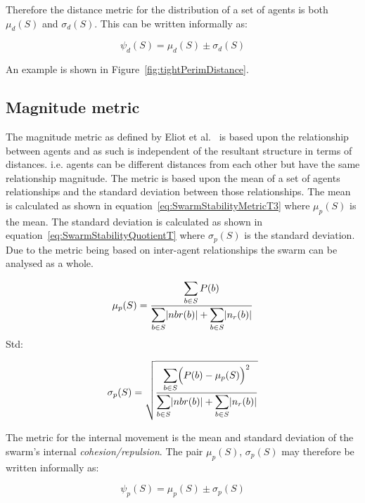 \documentclass[12pt,a4paper]{IEEEtran}
\newcommand{\card}[1]{\vert{#1}\vert}
\begin{document}
Therefore the distance metric for the distribution of a set of agents is both $\mu_d(S)$ and $\sigma_d(S)$. This can be written informally as:

\small
\begin{equation}
\label{eq:SwarmPotentialMagnitude}
\psi_d(S) = \mu_d(S)\pm \sigma_d(S)
\end{equation}
\normalsize

An example is shown in Figure~\ref{fig:tightPerimDistance}.

\subsection{Magnitude metric}
The magnitude metric as defined by Eliot et al.~\cite{eliot2018metric} is based upon the relationship between agents and as such is independent of the resultant structure in terms of distances. i.e. agents can be different distances from each other but have the same relationship magnitude.
The metric is based upon the mean of a set of agents relationships and the standard deviation between those relationships. The mean is calculated as shown in equation~\ref{eq:SwarmStabilityMetricT3} where $\mu_p(S)$ is the mean. The standard deviation is calculated as shown in equation~\ref{eq:SwarmStabilityQuotientT} where $\sigma_p(S)$ is the standard deviation. Due to the metric being based on inter-agent relationships the swarm can be analysed as a whole.

\small
\begin{equation}
\label{eq:SwarmStabilityMetricT3}
\mu_p(S) = \frac{\mathlarger{\sum_{b \in S} P(b)}}{\mathlarger{\sum_{b \in S}}\card{nbr(b)} + \mathlarger{\sum_{b \in S}}\card{n_r(b)}}
\end{equation}
\normalsize
Std:

\small
\begin{equation}
\label{eq:SwarmStabilityQuotientT}
\sigma_p(S) = \sqrt{\frac{\mathlarger{\sum_{b \in S}}\Big(P(b)-\mu_p(S)\Big)^2}{\mathlarger{\sum_{b \in S}}\card{nbr(b)} + \mathlarger{\sum_{b \in S}}\card{n_r(b)}}}
\end{equation}
\normalsize

The metric for the internal movement is the mean and standard deviation of the swarm's internal \emph{cohesion/repulsion}. The pair $\mu_p(S)$, $\sigma_p(S)$ may therefore be written informally as: 

\small
\begin{equation}
\label{eq:SwarmMagnitudeMatric}
\psi_p(S) = \mu_p(S)\pm \sigma_p(S)
\end{equation}
\normalsize
\end{document}
